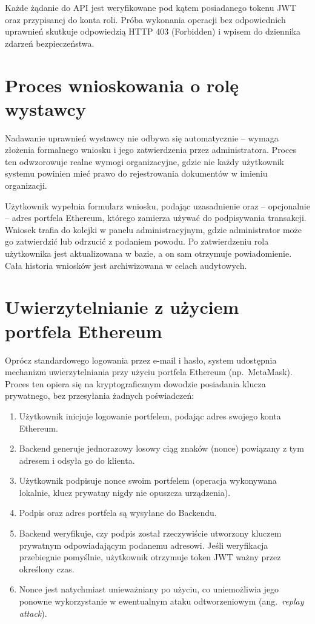 \documentclass[12pt,a4paper,twoside]{report}
\begin{document}
Każde żądanie do API jest weryfikowane pod kątem posiadanego tokenu JWT oraz przypisanej
do konta roli. Próba wykonania operacji bez odpowiednich uprawnień skutkuje odpowiedzią
HTTP 403 (Forbidden) i wpisem do dziennika zdarzeń bezpieczeństwa.

\section{Proces wnioskowania o rolę wystawcy}

Nadawanie uprawnień wystawcy nie odbywa się automatycznie -- wymaga złożenia formalnego
wniosku i jego zatwierdzenia przez administratora. Proces ten odwzorowuje realne wymogi
organizacyjne, gdzie nie każdy użytkownik systemu powinien mieć prawo do rejestrowania
dokumentów w imieniu organizacji.

Użytkownik wypełnia formularz wniosku, podając uzasadnienie oraz -- opcjonalnie --
adres portfela Ethereum, którego zamierza używać do podpisywania transakcji. Wniosek
trafia do kolejki w panelu administracyjnym, gdzie administrator może go zatwierdzić
lub odrzucić z podaniem powodu. Po zatwierdzeniu rola użytkownika jest aktualizowana
w bazie, a on sam otrzymuje powiadomienie. Cała historia wniosków jest archiwizowana
w celach audytowych.

\newpage
\section{Uwierzytelnianie z użyciem portfela Ethereum}

Oprócz standardowego logowania przez e-mail i hasło, system udostępnia mechanizm
uwierzytelniania przy użyciu portfela Ethereum (np.~MetaMask). Proces ten opiera się
na kryptograficznym dowodzie posiadania klucza prywatnego, bez przesyłania żadnych
poświadczeń:

\begin{enumerate}
    \item Użytkownik inicjuje logowanie portfelem, podając adres swojego konta Ethereum.
    \item Backend generuje jednorazowy losowy ciąg znaków (nonce) powiązany z tym adresem
          i odsyła go do klienta.
    \item Użytkownik podpisuje nonce swoim portfelem (operacja wykonywana lokalnie,
          klucz prywatny nigdy nie opuszcza urządzenia).
    \item Podpis oraz adres portfela są wysyłane do Backendu.
    \item Backend weryfikuje, czy podpis został rzeczywiście utworzony kluczem prywatnym
          odpowiadającym podanemu adresowi. Jeśli weryfikacja przebiegnie pomyślnie,
          użytkownik otrzymuje token JWT ważny przez określony czas.
    \item Nonce jest natychmiast unieważniany po użyciu, co uniemożliwia jego ponowne
          wykorzystanie w ewentualnym ataku odtworzeniowym (ang.~\textit{replay attack}).
\end{enumerate}
\end{document}
